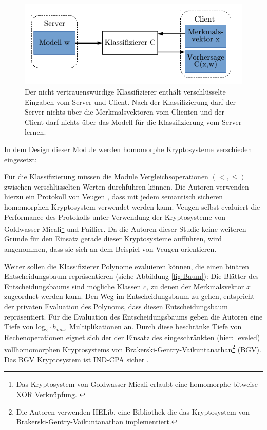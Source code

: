 \begin{figure}[h]
	\begin{center}
		\includegraphics{fig/ML}
		\caption{Der nicht vertrauenswürdige Klassifizierer enthält verschlüsselte Eingaben vom Server und Client. Nach der Klassifizierung darf der Server nichts über die Merkmalsvektoren vom Clienten und der Client darf nichts über das Modell für die Klassifizierung vom Server lernen.}
		\label{fig:ML}
	\end{center}
\end{figure}

In dem Design dieser Module werden homomorphe Kryptosysteme verschieden eingesetzt:

Für die Klassifizierung müssen die Module Vergleichsoperationen $(<,\leq)$ zwischen verschlüsselten Werten durchführen können. Die Autoren verwenden hierzu ein Protokoll von Veugen \cite{veugen2011comparing}, dass mit jedem semantisch sicheren homomorphen Kryptosystem verwendet werden kann. Veugen selbst evaluiert die Performance des Protokolls unter Verwendung der Kryptosysteme von Goldwasser-Micali\footnote{Das Kryptosystem von Goldwasser-Micali erlaubt eine homomorphe bitweise XOR Verknüpfung. \cite{goldwasser1984probabilistic}} und Paillier. Da die Autoren dieser Studie keine weiteren Gründe für den Einsatz gerade dieser Kryptosysteme aufführen, wird angenommen, dass sie sich an dem Beispiel von Veugen orientieren.

Weiter sollen die Klassifizierer Polynome evaluieren können, die einen binären Entscheidungsbaum repräsentieren (siehe Abbildung \ref{fig:Baum}): Die Blätter des Entscheidungsbaums sind mögliche Klassen $c$, zu denen der Merkmalsvektor $x$ zugeordnet werden kann. Den Weg im Entscheidungsbaum zu gehen, entspricht der privaten Evaluation des Polynoms, dass diesen Entscheidungsbaum repräsentiert. Für die Evaluation des Entscheidungsbaums geben die Autoren eine Tiefe von $\text{log}_2\cdot h_{max}$ Multiplikationen an. Durch diese beschränke Tiefe von Rechenoperationen eignet sich der der Einsatz des eingeschränkten (hier: leveled) vollhomomorphen Kryptosystems von Brakerski-Gentry-Vaikuntanathan\footnote{Die Autoren verwenden HELib, eine Bibliothek die das Kryptosystem von Brakerski-Gentry-Vaikuntanathan implementiert.} (BGV). Das BGV Kryptosystem ist IND-CPA sicher \cite{Brakerski2012LeveledFH}.


